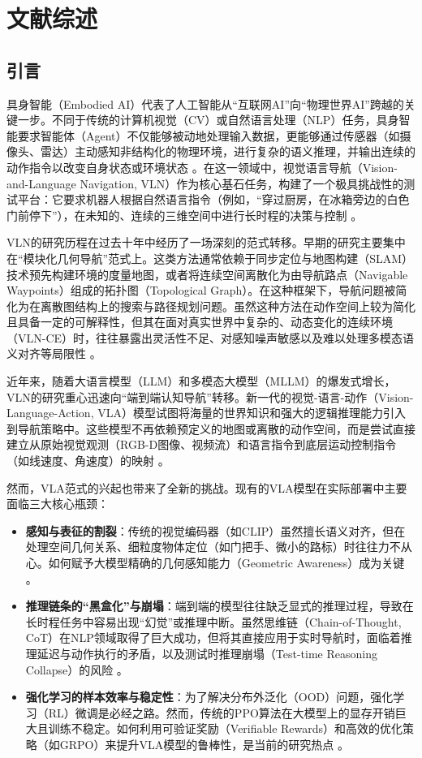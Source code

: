 \cleardoublepage
\newrefsection
\chapter{文献综述}

\section{引言}
具身智能（Embodied AI）代表了人工智能从“互联网AI”向“物理世界AI”跨越的关键一步。不同于传统的计算机视觉（CV）或自然语言处理（NLP）任务，具身智能要求智能体（Agent）不仅能够被动地处理输入数据，更能够通过传感器（如摄像头、雷达）主动感知非结构化的物理环境，进行复杂的语义推理，并输出连续的动作指令以改变自身状态或环境状态 \cite{omnivla, bridging_gap}。在这一领域中，视觉语言导航（Vision-and-Language Navigation, VLN）作为核心基石任务，构建了一个极具挑战性的测试平台：它要求机器人根据自然语言指令（例如，“穿过厨房，在冰箱旁边的白色门前停下”），在未知的、连续的三维空间中进行长时程的决策与控制 \cite{anderson2018vision, krantz2020beyond}。

VLN的研究历程在过去十年中经历了一场深刻的范式转移。早期的研究主要集中在“模块化几何导航”范式上。这类方法通常依赖于同步定位与地图构建（SLAM）技术预先构建环境的度量地图，或者将连续空间离散化为由导航路点（Navigable Waypoints）组成的拓扑图（Topological Graph）。在这种框架下，导航问题被简化为在离散图结构上的搜索与路径规划问题。虽然这种方法在动作空间上较为简化且具备一定的可解释性，但其在面对真实世界中复杂的、动态变化的连续环境（VLN-CE）时，往往暴露出灵活性不足、对感知噪声敏感以及难以处理多模态语义对齐等局限性 \cite{bridging_gap, savva2019habitat}。

近年来，随着大语言模型（LLM）和多模态大模型（MLLM）的爆发式增长，VLN的研究重心迅速向“端到端认知导航”转移。新一代的视觉-语言-动作（Vision-Language-Action, VLA）模型试图将海量的世界知识和强大的逻辑推理能力引入到导航策略中。这些模型不再依赖预定义的地图或离散的动作空间，而是尝试直接建立从原始视觉观测（RGB-D图像、视频流）和语言指令到底层运动控制指令（如线速度、角速度）的映射  。

然而，VLA范式的兴起也带来了全新的挑战。现有的VLA模型在实际部署中主要面临三大核心瓶颈：
\begin{itemize}
    \item \textbf{感知与表征的割裂}：传统的视觉编码器（如CLIP）虽然擅长语义对齐，但在处理空间几何关系、细粒度物体定位（如门把手、微小的路标）时往往力不从心。如何赋予大模型精确的几何感知能力（Geometric Awareness）成为关键  。
    \item \textbf{推理链条的“黑盒化”与崩塌}：端到端的模型往往缺乏显式的推理过程，导致在长时程任务中容易出现“幻觉”或推理中断。虽然思维链（Chain-of-Thought, CoT）在NLP领域取得了巨大成功，但将其直接应用于实时导航时，面临着推理延迟与动作执行的矛盾，以及测试时推理崩塌（Test-time Reasoning Collapse）的风险  。
    \item \textbf{强化学习的样本效率与稳定性}：为了解决分布外泛化（OOD）问题，强化学习（RL）微调是必经之路。然而，传统的PPO算法在大模型上的显存开销巨大且训练不稳定。如何利用可验证奖励（Verifiable Rewards）和高效的优化策略（如GRPO）来提升VLA模型的鲁棒性，是当前的研究热点  。
\end{itemize}

